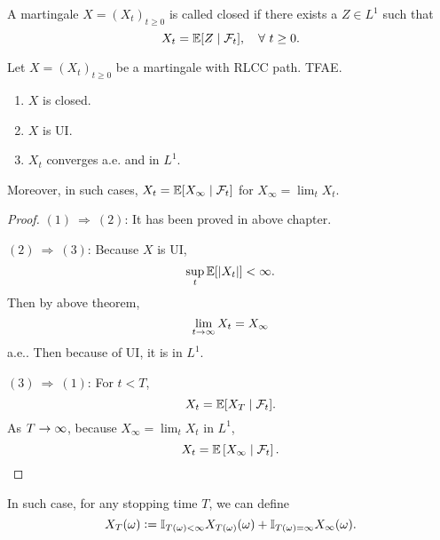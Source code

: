 \begin{defn}[Closedness]
    A martingale $X=(X_t)_{t\geq 0}$ is called closed if there exists a $Z \in L^1$ such that
    \begin{equation*}
        X_t = \mathbb{E}[Z \mid \mathcal{F}_t],\quad \forall~ t \geq 0.
    \end{equation*}
\end{defn}

\begin{thm}
    Let $X = (X_t)_{t \geq 0}$ be a martingale with RLCC path. TFAE.
    \begin{enumerate}[label=(\arabic{*})]
        \item $X$ is closed.
        \item $X$ is UI.
        \item $X_t$ converges a.e. and in $L^1$.
    \end{enumerate}
    Moreover, in such cases, $X_t = \mathbb{E}[X_\infty \mid \mathcal{F}_t]$ for $X_\infty = \lim_t X_t$.
\end{thm}
\begin{proof}
    $(1) ~\Rightarrow~ (2)$: It has been proved in above chapter.

    \noindent $(2) ~\Rightarrow~ (3)$: Because $X$ is UI,
    \begin{equation*}
        \sup_t \mathbb{E}[\left\lvert X_t\right\lvert] < \infty.
    \end{equation*}
    Then by above theorem,
    \begin{equation*}
        \lim_{t \rightarrow \infty} X_t = X_\infty
    \end{equation*}
    a.e..  Then because of UI, it is in $L^1$.

    \noindent $(3)~\Rightarrow~(1)$: For $t < T$,
    \begin{equation*}
        X_t = \mathbb{E}[X_T \mid \mathcal{F}_t].
    \end{equation*}
    As $T \rightarrow \infty$, because $X_\infty = \lim_t X_t$ in $L^1$,
    \begin{equation*}
        X_t = \mathbb{E}\left[X_\infty \mid \mathcal{F}_t\right]. \qedhere
    \end{equation*}
\end{proof}
\begin{rmk}
    In such case, for any stopping time $T$, we can define
    \begin{equation*}
        X_T(\omega) \vcentcolon= \mathbb{I}_{T(\omega) < \infty} X_{T(\omega)}(\omega) + \mathbb{I}_{T(\omega) = \infty}X_\infty(\omega).
    \end{equation*}
\end{rmk}

